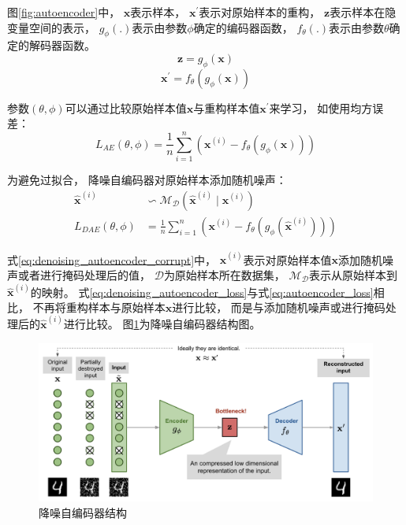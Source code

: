 图{\ref{fig:autoencoder}}中，
{$\bm{x}$}表示样本，
{$\bm{x}^{'}$}表示对原始样本的重构，
{$\bm{z}$}表示样本在隐变量空间的表示，
{$g_{\phi}(.)$}表示由参数{$\phi$}确定的编码器函数，
{$f_{\theta}(.)$}表示由参数{$\theta$}确定的解码器函数。
\begin{equation}
    \label{eq:vae_encoder}
    \bm{z}=g_{\phi}(\bm{x})
\end{equation}
\begin{equation}
    \label{eq:vae_decoder}
    \bm{x}^{'}=f_{\theta}(g_{\phi}(\bm{x}))
\end{equation}

参数{$(\theta,\phi)$}可以通过比较原始样本值{$\bm{x}$}与重构样本值{$\bm{x}^{'}$}来学习，
如使用均方误差：
\begin{equation}
    \label{eq:autoencoder_loss}
    L_{AE}(\theta,\phi)=\frac{1}{n} \sum_{i=1}^{n}(\bm{x}^{(i)} - f_{\theta}(g_{\phi}(\bm{x})))
\end{equation}

为避免过拟合，
降噪自编码器{ {\cite{vincent2008extracting}}}对原始样本添加随机噪声：
\begin{align}
    \hat{\bm{x}}^{(i)} 
    & \backsim \mathcal{M}_{\mathcal{D}}(\hat{\bm{x}}^{(i)} \mid \bm{x}^{(i)}) \label{eq:denoising_autoencoder_corrupt}   \\
    L_{DAE}(\theta,\phi)
    &=\frac{1}{n} \sum_{i=1}^{n}(\bm{x}^{(i)} - f_{\theta}(g_{\phi}(\hat{\bm{x}}^{(i)} ))) \label{eq:denoising_autoencoder_loss}
\end{align}

式{\ref{eq:denoising_autoencoder_corrupt}}中，
{$\hat{\bm{x}}^{(i)} $}表示对原始样本值{$\bm{x}$}添加随机噪声或者进行掩码处理后的值，
{$\mathcal{D}$}为原始样本所在数据集，
{$ \mathcal{M}_{\mathcal{D}}$}表示从原始样本到{$\hat{\bm{x}}^{(i)} $}的映射。
式{\ref{eq:denoising_autoencoder_loss}}与式{\ref{eq:autoencoder_loss}}相比，
不再将重构样本与原始样本{$\bm{x}$}进行比较，
而是与添加随机噪声或进行掩码处理后的{$\hat{\bm{x}}^{(i)} $}进行比较。
图{\ref{fig:denoising_autoencoder_architecture}}为降噪自编码器结构图。
\begin{figure}[ht]
    \centering
    \includegraphics[width=1\textwidth]{figures/denoising_autoencoder_architecture}
    \caption{降噪自编码器结构}\label{fig:denoising_autoencoder_architecture}
\end{figure}

